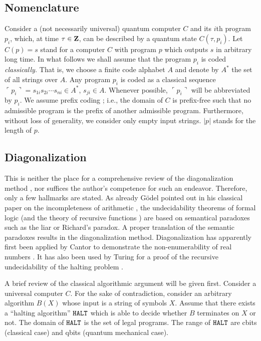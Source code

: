 \subsection{Nomenclature}
 Consider a (not necessarily universal) quantum computer $C$ and its
$i$th
 program $p_i$,
 which, at time $\tau \in {\bf Z}$, can be described by a quantum state
$C(\tau , p_i)$.
Let $C(p)=s$ stand for a computer $C$ with program $p$ which outputs $s$
in arbitrary long time.
In what follows we shall assume that the program $p_i$ is
coded {\em classically.} That is, we choose a finite code alphabet $A$
and denote by $A^\ast$ the set of all strings over $A$.
Any program $p_i$ is coded as a classical sequence
$
\ulcorner
p_i
\urcorner
=s_{1i}s_{2i}\cdots s_{ni}\in A^\ast $, $s_{ji}\in A$.
Whenever possible, $
\ulcorner
p_i
\urcorner
$ will be abbreviated by $p_i$.
We assume prefix coding
\cite{hamming,chaitin2,chaitin3,svozil-93,calude:94}; i.e., the domain
of
$C$
is prefix-free such that no admissible program is the prefix of another
admissible program.
Furthermore, without loss of generality, we consider only empty input
strings.
$\vert p\vert$ stands for the length of $p$.

\subsection{Diagonalization}

This is neither the place for a comprehensive review of the
diagonalization method \cite{rogers1,odi:89}, nor suffices the
author's competence
for such an endeavor. Therefore, only a few hallmarks are stated.
As already G\"odel pointed out in his classical paper
on the incompleteness of arithmetic
\cite{godel1},
the undecidability theorems of formal logic \cite{davis-58}
(and the theory of recursive functions
\cite{rogers1,odi:89})
are based on semantical paradoxes
such as the liar
\cite{martin} or Richard's paradox.
A proper translation of the semantic paradoxes results in
the diagonalization method. Diagonalization
has apparently first been applied by
Cantor to demonstrate the non-enumerability of real numbers
\cite{cantor}. It has also been used by Turing for a proof
of the recursive undecidability of the halting problem \cite{turing-36}.


A brief review of the classical algorithmic argument will be given
first.  Consider a universal computer $C$. For the sake of
contradiction, consider an arbitrary algorithm
$B(X)$ whose input is a string of symbols $X$.  Assume that there exists
a ``halting algorithm'' ${\tt HALT}$ which is able to decide whether $B$
terminates on $X$ or not.
The domain of ${\tt HALT}$  is the set of legal programs.
The range of ${\tt HALT}$ are cbits (classical case) and qbits (quantum
mechanical case).

